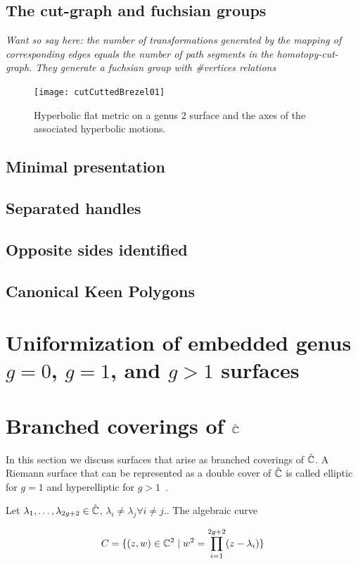 \subsection{The cut-graph and fuchsian groups}
\emph{Want so say here: the number of transformations generated by the mapping of corresponding edges equals the number of path segments in the homotopy-cut-graph. They generate a fuchsian group with \#vertices relations}


\begin{figure}
\centering
\texttt{[image: cutCuttedBrezel01]}
\caption{Hyperbolic flat metric on a genus $2$ surface and the axes of the associated hyperbolic motions.}
\label{fig:axes_of_motion}
\end{figure}

\subsection{Minimal presentation}
\subsection{Separated handles}
\subsection{Opposite sides identified}
\subsection{Canonical Keen Polygons}

\section{Uniformization of embedded genus $g=0$, $g=1$, and $g>1$ surfaces}

\section{Branched coverings of $\hat{\mathbb C}$}
In this section we discuss surfaces that arise as branched coverings of $\hat{\mathbb C}$. A Riemann surface that can be represented as a double cover of $\hat{\mathbb C}$ is called elliptic for $g=1$ and hyperelliptic for $g>1$~\cite[p.~235]{Jost2007}. 

Let $\lambda_1,\ldots,\lambda_{2g+2}\in \hat{\mathbb C}$, $\lambda_i\neq \lambda_j \forall i\neq j.$. The algebraic curve

\begin{equation}
\label{eq:branched_cover}
C=\{(z,w)\in\mathbb C^2 \mid w^2 = \prod_{i=1}^{2g+2}(z-\lambda_i)\}
\end{equation}

